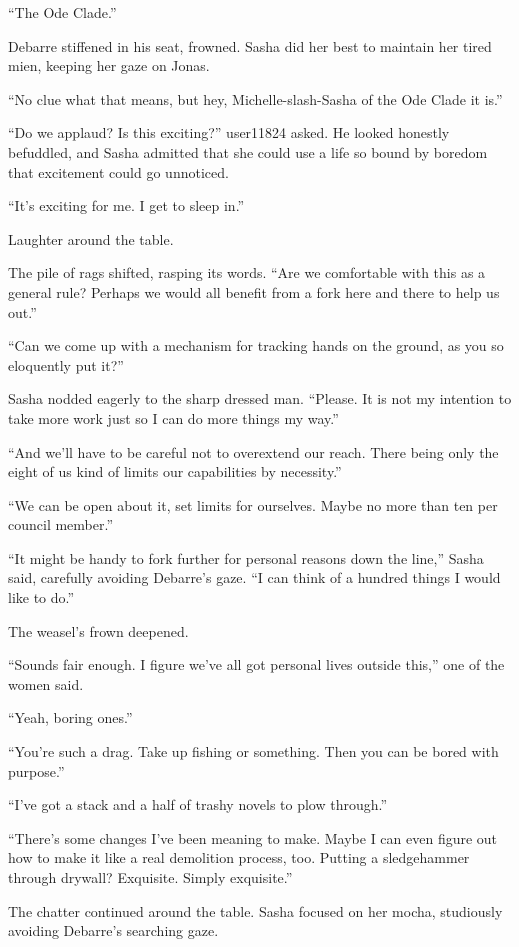 ``The Ode Clade.''

Debarre stiffened in his seat, frowned. Sasha did her best to maintain her tired mien, keeping her gaze on Jonas.

``No clue what that means, but hey, Michelle-slash-Sasha of the Ode Clade it is.''

``Do we applaud? Is this exciting?'' user11824 asked. He looked honestly befuddled, and Sasha admitted that she could use a life so bound by boredom that excitement could go unnoticed.

``It's exciting for me. I get to sleep in.''

Laughter around the table.

The pile of rags shifted, rasping its words. ``Are we comfortable with this as a general rule? Perhaps we would all benefit from a fork here and there to help us out.''

``Can we come up with a mechanism for tracking hands on the ground, as you so eloquently put it?''

Sasha nodded eagerly to the sharp dressed man. ``Please. It is not my intention to take more work just so I can do more things my way.''

``And we'll have to be careful not to overextend our reach. There being only the eight of us kind of limits our capabilities by necessity.''

``We can be open about it, set limits for ourselves. Maybe no more than ten per council member.''

``It might be handy to fork further for personal reasons down the line,'' Sasha said, carefully avoiding Debarre's gaze. ``I can think of a hundred things I would like to do.''

The weasel's frown deepened.

``Sounds fair enough. I figure we've all got personal lives outside this,'' one of the women said.

``Yeah, boring ones.''

``You're such a drag. Take up fishing or something. Then you can be bored with purpose.''

``I've got a stack and a half of trashy novels to plow through.''

``There's some changes I've been meaning to make. Maybe I can even figure out how to make it like a real demolition process, too. Putting a sledgehammer through drywall? Exquisite. Simply exquisite.''

The chatter continued around the table. Sasha focused on her mocha, studiously avoiding Debarre's searching gaze.


